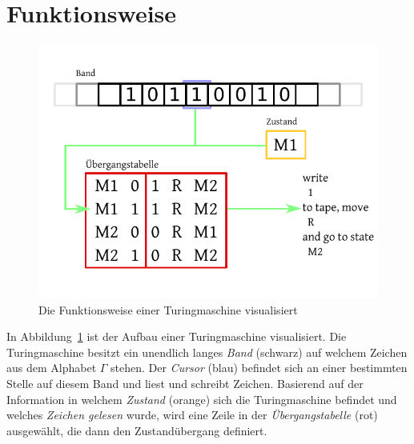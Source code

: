 \section{Funktionsweise}
%
\begin{figure}[ht]
 \begin{center}
  \includegraphics{img/turingmachine_visualization.pdf}
  \caption{Die Funktionsweise einer Turingmaschine visualisiert}
  \label{fig:tm_vis}
 \end{center}
\end{figure}
%
In Abbildung~\ref{fig:tm_vis} ist der Aufbau einer Turingmaschine visualisiert. Die Turingmaschine besitzt ein unendlich langes \emph{Band} (schwarz) auf welchem Zeichen aus dem Alphabet $\Gamma$ stehen. Der \emph{Cursor} (blau) befindet sich an einer bestimmten Stelle auf diesem Band und liest und schreibt Zeichen. Basierend auf der Information in welchem \emph{Zustand} (orange) sich die Turingmaschine befindet und welches \emph{Zeichen gelesen} wurde, wird eine Zeile in der \emph{Übergangstabelle} (rot) ausgewählt, die dann den Zustandübergang definiert.

